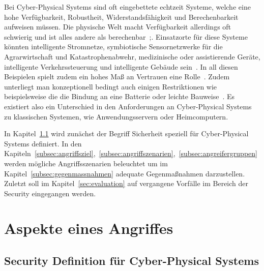 \documentclass[final,bibliography=totocnumbered]{include/sikseminar}
\begin{document}
Bei Cyber-Physical Systems sind oft eingebettete echtzeit Systeme, welche eine hohe Verfügbarkeit, Robustheit, Widerstandsfähigkeit und Berechenbarkeit aufweisen müssen.
Die physische Welt macht Verfügbarkeit allerdings oft schwierig und ist alles andere als berechenbar~\cite{Lee08,SGL+08};.
Einsatzorte für diese Systeme könnten intelligente Stromnetze, symbiotische Sensornetzwerke für die Agrarwirtschaft und Katastrophenabwehr, medizinische oder assistierende Geräte, intelligente Verkehrssteuerung und intelligente Gebäude sein~\cite{RLS+10}.
In all diesen Beispielen spielt zudem ein hohes Maß an Vertrauen eine Rolle~\cite{SGL+08}.
Zudem unterliegt man konzeptionell bedingt auch einigen Restriktionen wie beispielsweise die die Bindung an eine Batterie oder leichte Bauweise~\cite{YWY+17}.
Es existiert also ein Unterschied in den Anforderungen an Cyber-Physical Systems zu klassischen Systemen, wie Anwendungsservern oder Heimcomputern.

In Kapitel~\ref{subsec:definition} wird zunächst der Begriff Sicherheit speziell für Cyber-Physical Systems definiert.
In den Kapiteln~\ref{subsec:angriffsziel},~\ref{subsec:angriffszenarien},~\ref{subsec:angreifergruppen} werden mögliche Angriffsszenarien beleuchtet um im Kapitel~\ref{subsec:gegenmassnahmen} adequate Gegenmaßnahmen darzustellen.
Zuletzt soll im Kapitel~\ref{sec:evaluation} auf vergangene Vorfälle im Bereich der Security eingegangen werden.







\section{Aspekte eines Angriffes}\label{sec:aspekte}


\subsection{Security Definition f\"ur Cyber-Physical Systems}\label{subsec:definition}
\end{document}
